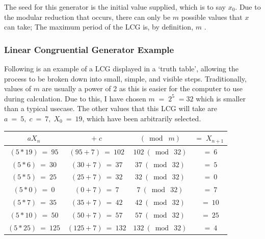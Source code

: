 \documentclass[11pt,a4paper]{article}
\begin{document}
            The seed for this generator is the initial value supplied, which is to say $x_{0}$.
            Due to the modular reduction that occurs, there can only be $m$ possible values that $x$ can take; The maximum period of the LCG is, by definition, $m$
            \citep{Gentle03}.

            \subsubsection{Linear Congruential Generator Example}
                Following is an example of a LCG displayed in a `truth table', allowing the process to be broken down into small, simple, and visible steps.
                Traditionally, values of $m$ are usually a power of 2 as this is easier for the computer to use during calculation. Due to this, I have chosen $m\; =\; 2^5\; = 32$ which is smaller than a typical usecase. 
                The other values that this LCG will take are $a\: =\: 5,\; c\: =\: 7,\; X_0\: =\: 19$, which have been arbitrarily selected.

                \begin{center}
                    \normalsize\begin{tabular}{|| c || c || c |||| c ||}
                        \hline
                        $aX_{n}$ & $+\; c$ & $( \bmod\; m)$ & $=\; X_{n+1}$ \\ [0.5ex] 
                        \hline\hline
                        $(5 * 19)\: =\: 95$ & $(95 + 7)\: =\: 102$ & $102\: (\bmod\: 32)$ & $\: =\: 6$ \\ 
                        \hline
                        $(5 * 6)\: =\: 30$ & $(30 + 7)\: =\: 37$ & $37\: (\bmod\: 32)$ & $\: =\: 5$ \\ 
                        \hline
                        $(5 * 5)\: =\: 25$ & $(25 + 7)\: =\: 32$ & $32\: (\bmod\: 32)$ & $\: =\: 0$ \\ 
                        \hline
                        $(5 * 0)\: =\: 0$ & $(0 + 7)\: =\: 7$ & $7\: (\bmod\: 32)$ & $\: =\: 7$ \\ 
                        \hline
                        $(5 * 7)\: =\: 35$ & $(35 + 7)\: =\: 42$ & $42\: (\bmod\: 32)$ & $\: =\: 10$ \\ 
                        \hline
                        $(5 * 10)\: =\: 50$ & $(50 + 7)\: =\: 57$ & $57\: (\bmod\: 32)$ & $\: =\: 25$ \\ 
                        \hline
                        $(5 * 25)\: =\: 125$ & $(125 + 7)\: =\: 132$ & $132\: (\bmod\: 32)$ & $\: =\: 4$ \\ 
                        \hline
                    \end{tabular}
                \end{center}
\end{document}
